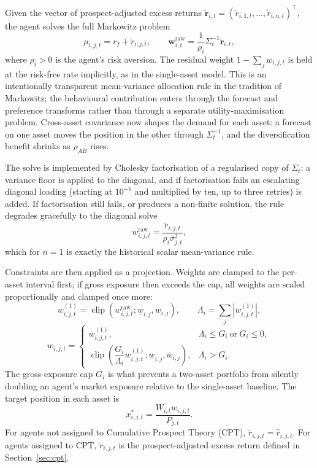 \documentclass[12pt, a4paper]{article}
\DeclareMathOperator{\clip}{clip}
\begin{document}
    Given the vector of prospect-adjusted excess returns
    \(\breve{\mathbf r}_{i,t}=(\breve r_{i,1,t},\ldots,\breve r_{i,n,t})^{\top}\),
    the agent solves the full Markowitz problem
    \[
        \mu_{i,j,t}=r_f+\breve r_{i,j,t},
        \qquad
        \mathbf w_{i,t}^{\mathrm{raw}}
        =
        \frac{1}{\rho_i}\Sigma_t^{-1}\breve{\mathbf r}_{i,t},
    \]
    where \(\rho_i>0\) is the agent's risk aversion. The residual weight
    \(1-\sum_j w_{i,j,t}\) is held at the risk-free rate implicitly, as in the
    single-asset model. This is an intentionally transparent mean-variance
    allocation rule in the tradition of Markowitz; the behavioural contribution
    enters through the forecast and preference transforms rather than through a
    separate utility-maximisation problem. Cross-asset covariance now shapes the
    demand for each asset: a forecast on one asset moves the position in the
    other through \(\Sigma_t^{-1}\), and the diversification benefit shrinks as
    \(\rho_{AB}\) rises.

    The solve is implemented by Cholesky factorisation of a regularised copy of
    \(\Sigma_t\): a variance floor is applied to the diagonal, and if
    factorisation fails an escalating diagonal loading (starting at \(10^{-6}\)
    and multiplied by ten, up to three retries) is added. If factorisation still
    fails, or produces a non-finite solution, the rule degrades gracefully to the
    diagonal solve
    \[
        w_{i,j,t}^{\mathrm{raw}}
        =
        \frac{\breve r_{i,j,t}}{\rho_i\sigma_{j,t}^{2}},
    \]
    which for \(n=1\) is exactly the historical scalar mean-variance rule.

    Constraints are then applied as a projection. Weights are clamped to the
    per-asset interval first; if gross exposure then exceeds the cap, all weights
    are scaled proportionally and clamped once more:
    \[
        w_{i,j,t}^{(1)}=\clip\!\left(w_{i,j,t}^{\mathrm{raw}};\underline w_{i,j},\overline w_{i,j}\right),
        \qquad
        \Lambda_i=\sum_{j}\left|w_{i,j,t}^{(1)}\right|,
    \]
    \[
        w_{i,j,t}=
        \begin{cases}
            w_{i,j,t}^{(1)}, & \Lambda_i\le G_i \ \text{or}\ G_i\le 0,\\[1.2ex]
            \clip\!\left(\dfrac{G_i}{\Lambda_i}w_{i,j,t}^{(1)};\underline w_{i,j},\overline w_{i,j}\right), & \Lambda_i>G_i.
        \end{cases}
    \]
    The gross-exposure cap \(G_i\) is what prevents a two-asset portfolio from
    silently doubling an agent's market exposure relative to the single-asset
    baseline. The target position in each asset is
    \[
        x_{i,j,t}^{\ast}=\frac{W_{i,t}w_{i,j,t}}{P_{j,t}}.
    \]
    For agents not assigned to Cumulative Prospect Theory (CPT),
    \(\breve r_{i,j,t}=\hat r_{i,j,t}\). For agents assigned to CPT,
    \(\breve r_{i,j,t}\) is the prospect-adjusted excess return defined in
    Section~\ref{sec:cpt}.
\end{document}
